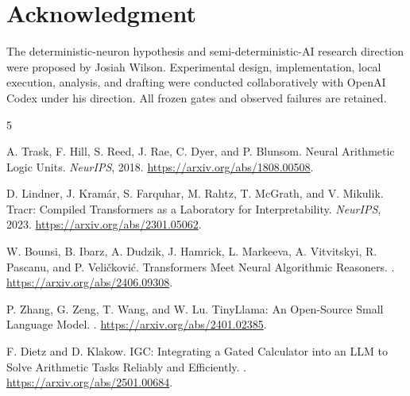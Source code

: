 \documentclass[11pt]{article}
\begin{document}
\section*{Acknowledgment}

The deterministic-neuron hypothesis and semi-deterministic-AI research
direction were proposed by Josiah Wilson. Experimental design, implementation,
local execution, analysis, and drafting were conducted collaboratively with
OpenAI Codex under his direction. All frozen gates and observed failures are
retained.

\begin{thebibliography}{5}

A. Trask, F. Hill, S. Reed, J. Rae, C. Dyer, and P. Blunsom.
\newblock Neural Arithmetic Logic Units.
\newblock \emph{NeurIPS}, 2018.
\newblock \url{https://arxiv.org/abs/1808.00508}.

D. Lindner, J. Kram\'{a}r, S. Farquhar, M. Rahtz, T. McGrath, and V. Mikulik.
\newblock Tracr: Compiled Transformers as a Laboratory for Interpretability.
\newblock \emph{NeurIPS}, 2023.
\newblock \url{https://arxiv.org/abs/2301.05062}.

W. Bounsi, B. Ibarz, A. Dudzik, J. Hamrick, L. Markeeva, A. Vitvitskyi,
R. Pascanu, and P. Veli\v{c}kovi\'{c}.
\newblock Transformers Meet Neural Algorithmic Reasoners.
.
\newblock \url{https://arxiv.org/abs/2406.09308}.

P. Zhang, G. Zeng, T. Wang, and W. Lu.
\newblock TinyLlama: An Open-Source Small Language Model.
.
\newblock \url{https://arxiv.org/abs/2401.02385}.

F. Dietz and D. Klakow.
\newblock IGC: Integrating a Gated Calculator into an LLM to Solve Arithmetic
Tasks Reliably and Efficiently.
.
\newblock \url{https://arxiv.org/abs/2501.00684}.

\end{thebibliography}
\end{document}
